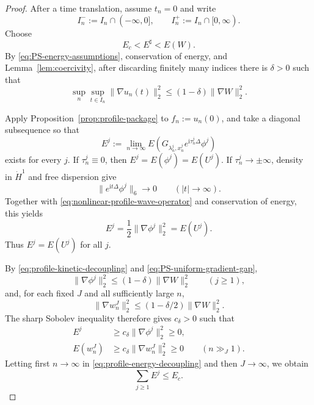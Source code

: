 \documentclass{interact}
\numberwithin{equation}{section}
\theoremstyle{plain}
\theoremstyle{definition}
\theoremstyle{remark}
\newcommand{\ii}{\mathrm i}
\begin{document}
\begin{proof}
After a time translation, assume $t_n=0$ and write
\[
 I_n^-:=I_n\cap(-\infty,0],
 \qquad
 I_n^+:=I_n\cap[0,\infty).
\]
Choose
\[
 E_c<E^\sharp<E(W).
\]
By \eqref{eq:PS-energy-assumptions}, conservation of energy, and Lemma~\ref{lem:coercivity}, after discarding finitely many indices there is $\delta>0$ such that
\begin{equation}\label{eq:PS-uniform-gradient-gap}
 \sup_n\sup_{t\in I_n}\|\nabla u_n(t)\|_2^2
 \le(1-\delta)\|\nabla W\|_2^2.
\end{equation}

Apply Proposition~\ref{prop:profile-package} to $f_n:=u_n(0)$, and take a diagonal subsequence so that
\[
 E^j
 :=\lim_{n\to\infty}
 E\!\left(G_{\lambda_n^j,x_n^j}
 e^{\ii\tau_n^j\Delta}\phi^j\right)
\]
exists for every $j$. If $\tau_n^j\equiv0$, then $E^j=E(\phi^j)=E(U^j)$. If $\tau_n^j\to\pm\infty$, density in $\dot H^1$ and free dispersion give
\[
 \|e^{\ii t\Delta}\phi^j\|_6\longrightarrow0
 \qquad(|t|\to\infty).
\]
Together with \eqref{eq:nonlinear-profile-wave-operator} and conservation of energy, this yields
\[
 E^j=\frac12\|\nabla\phi^j\|_2^2=E(U^j).
\]
Thus $E^j=E(U^j)$ for all $j$.

By \eqref{eq:profile-kinetic-decoupling} and \eqref{eq:PS-uniform-gradient-gap},
\begin{equation}\label{eq:PS-individual-gradient-gap}
 \|\nabla\phi^j\|_2^2
 \le(1-\delta)\|\nabla W\|_2^2
 \qquad(j\ge1),
\end{equation}
and, for each fixed $J$ and all sufficiently large $n$,
\[
 \|\nabla w_n^J\|_2^2
 \le(1-\delta/2)\|\nabla W\|_2^2.
\]
The sharp Sobolev inequality therefore gives $c_\delta>0$ such that
\begin{align}
 E^j&\ge c_\delta\|\nabla\phi^j\|_2^2\ge0,
 \label{eq:PS-profile-energy-positive}\\
 E(w_n^J)&\ge c_\delta\|\nabla w_n^J\|_2^2\ge0
 \qquad(n\gg_J1).
 \label{eq:PS-remainder-energy-positive}
\end{align}
Letting first $n\to\infty$ in \eqref{eq:profile-energy-decoupling} and then $J\to\infty$, we obtain
\[
 \sum_{j\ge1}E^j\le E_c.
\]


\end{proof}
\end{document}
